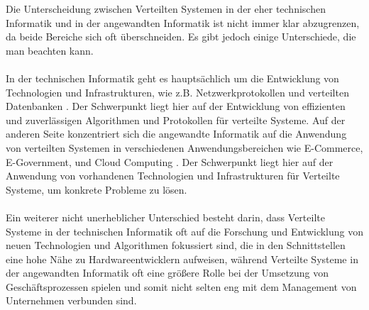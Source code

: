 \documentclass[../vs-script-first-v01.tex]{subfiles}
\begin{document}
Die Unterscheidung zwischen Verteilten Systemen in der eher technischen Informatik und in der angewandten Informatik ist nicht immer klar abzugrenzen, da beide Bereiche sich oft überschneiden. Es gibt jedoch einige Unterschiede, die man beachten kann.
\\\\
In der technischen Informatik geht es hauptsächlich um die Entwicklung von Technologien und Infrastrukturen, wie z.B. Netzwerkprotokollen und verteilten Datenbanken \cite{coulouris2012distributed}. Der Schwerpunkt liegt hier auf der Entwicklung von effizienten und zuverlässigen Algorithmen und Protokollen für verteilte Systeme. Auf der anderen Seite konzentriert sich die angewandte Informatik auf die Anwendung von verteilten Systemen in verschiedenen Anwendungsbereichen wie E-Commerce, E-Government, und Cloud Computing \cite{ghosh2012distributed}. Der Schwerpunkt liegt hier auf der Anwendung von vorhandenen Technologien und Infrastrukturen für Verteilte Systeme, um konkrete Probleme zu lösen.
\\\\
Ein weiterer nicht unerheblicher Unterschied besteht darin, dass Verteilte Systeme in der technischen Informatik oft auf die Forschung und Entwicklung von neuen Technologien und Algorithmen fokussiert sind, die in den Schnittstellen eine hohe Nähe zu Hardwareentwicklern aufweisen, während Verteilte Systeme in der angewandten Informatik oft eine größere Rolle bei der Umsetzung von Geschäftsprozessen spielen und somit nicht selten eng mit dem Management von Unternehmen verbunden sind\cite{birman2012guide}.
\end{document}
